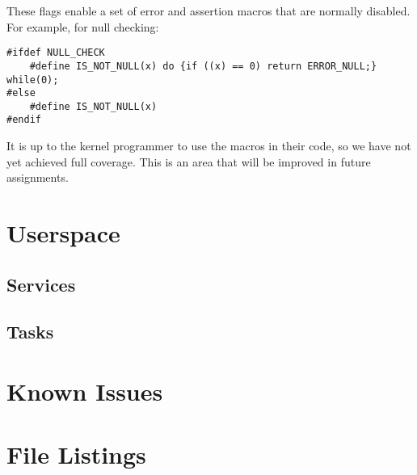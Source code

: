 \documentclass[twoside,a4paper]{refart}
\begin{document}
These flags enable a set of error and assertion macros that are normally disabled. For example, for null checking:

\begin{verbatim}
#ifdef NULL_CHECK
    #define IS_NOT_NULL(x) do {if ((x) == 0) return ERROR_NULL;} while(0);
#else
    #define IS_NOT_NULL(x)
#endif
\end{verbatim}

It is up to the kernel programmer to use the macros in their code, so we have not yet achieved full coverage. This is an area that will be improved in future assignments. 
\section{Userspace}
\subsection{Services}
\subsection{Tasks}

\section{Known Issues}
\section{File Listings}

\printindex
\end{document}
